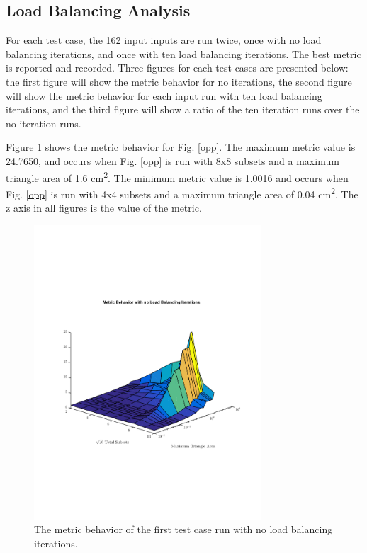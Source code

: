 \documentclass{anstrans}
\begin{document}
\subsection{Load Balancing Analysis}

For each test case, the 162 input inputs are run twice, once with no load balancing iterations, and once with ten load balancing iterations. The best metric is reported and recorded. Three figures for each test cases are presented below: the first figure will show the metric behavior for no iterations, the second figure will show the metric behavior for each input run with ten load balancing iterations, and the third figure will show a ratio of the ten iteration runs over the no iteration runs.

Figure \ref{oppnoiter} shows the metric behavior for Fig. \ref{opp}. The maximum metric value is 24.7650, and occurs when Fig. \ref{opp} is run with 8x8 subsets and a maximum triangle area of 1.6 cm\textsuperscript{2}. The minimum metric value is 1.0016 and occurs when Fig. \ref{opp} is run with 4x4 subsets and a maximum triangle area of 0.04 cm\textsuperscript{2}. The z axis in all figures is the value of the metric.

\begin{figure}
\centering
\includegraphics[width=85mm, trim = 0cm 5cm 0cm 5cm,clip]{figures/OppNoIter.pdf}
\caption{The metric behavior of the first test case run with no load balancing iterations.}
\label{oppnoiter}
\end{figure}
\end{document}
